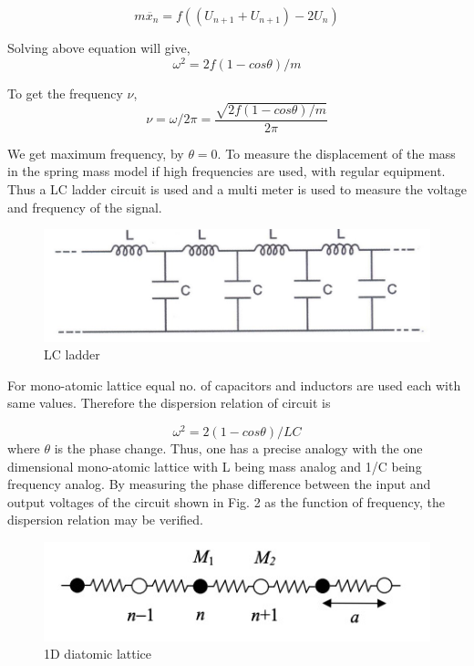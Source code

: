 \documentclass[a4paper, amsfonts, amssymb, amsmath, reprint, showkeys, nofootinbib, twoside]{revtex4-1}
\begin{document}
\begin{equation}
	m\ddot{x_n}=f((U_{n+1}+U_{n+1}) -2U_n)
\end{equation}

Solving above equation will give,
\begin{equation}
	\omega^2=2f(1-cos\theta)/m
\end{equation}

To get the frequency $\nu$,
\begin{equation}
	\nu=\omega/2\pi=\frac{\sqrt{2f(1-cos\theta)/m}}{2\pi}
\end{equation}

We get maximum frequency, by $\theta=0$. 
To measure the displacement of the mass in the spring mass model if high frequencies are used, with regular equipment. Thus a LC ladder circuit is used and a multi meter is used to measure the voltage and frequency of the signal.

\begin{figure}[H]
	\centering
	\includegraphics[scale=0.25]{2} 
	\caption{LC ladder}
	\label{s}
\end{figure}

For mono-atomic lattice equal no. of capacitors and inductors are used each with same values. Therefore the dispersion relation of circuit is 

\begin{equation}
	\omega^2=2(1-cos\theta)/LC
\end{equation}
where $\theta$ is the phase change. Thus, one
has a precise analogy with the one dimensional mono-atomic lattice with L being mass analog and 1/C being frequency analog. By measuring the phase difference between the input and output voltages of
the circuit shown in Fig. 2 as the function of frequency, the dispersion relation may be
verified.

\begin{figure}[H]
	\centering
	\includegraphics[scale=0.5]{3} 
	\caption{1D diatomic lattice}
	\label{s}
\end{figure}
\end{document}
